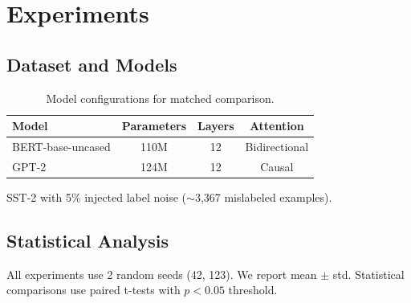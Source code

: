 \section{Experiments}

\subsection{Dataset and Models}

\begin{table}[h]
\centering
\begin{tabular}{@{}lccc@{}}
\toprule
Model & Parameters & Layers & Attention \\
\midrule
BERT-base-uncased & 110M & 12 & Bidirectional \\
GPT-2 & 124M & 12 & Causal \\
\bottomrule
\end{tabular}
\caption{Model configurations for matched comparison.}
\label{tab:models}
\end{table}

SST-2 with 5\% injected label noise ($\sim$3,367 mislabeled examples).

\subsection{Statistical Analysis}

All experiments use 2 random seeds (42, 123). We report mean $\pm$ std. Statistical comparisons use paired t-tests with $p<0.05$ threshold.
